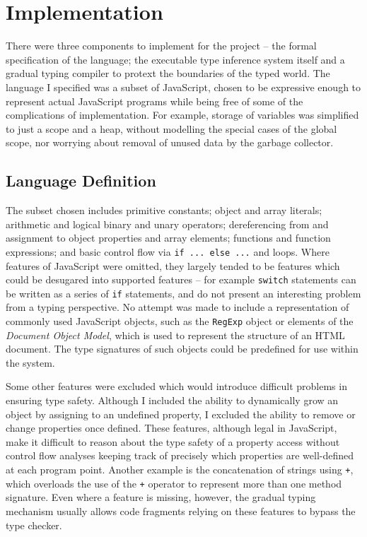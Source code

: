 \documentclass[12pt,a4paper,twoside,openright]{report}
\theoremstyle{definition}
\theoremstyle{dotless}
\newcommand*{\js}{\texttt}
\begin{document}
\chapter{Implementation}\label{implementation}

There were three components to implement for the project -- the formal
specification of the language; the executable type inference system itself and
a gradual typing compiler to protext the boundaries of the typed world.  The
language I specified was a subset of JavaScript, chosen to be expressive enough
to represent actual JavaScript programs while being free of some of the
complications of implementation. For example, storage of variables was
simplified to just a scope and a heap, without modelling the special cases of
the global scope, nor worrying about removal of unused data by the garbage
collector. 

\section{Language Definition}

The subset chosen includes primitive constants; object and array literals;
arithmetic and logical binary and unary operators; dereferencing from and
assignment to object properties and array elements; functions and function expressions; and basic control flow via \js{if ... else ...} and loops.  
Where features of JavaScript were omitted, they largely tended to be features
which could be desugared into supported features -- for example \js{switch}
statements can be written as a series of \js{if} statements, and do not present
an interesting problem from a typing perspective. No attempt was made to
include a representation of commonly used JavaScript objects, such as the
\js{RegExp} object or elements of the \textit{Document Object Model}, which is used to
represent the structure of an HTML document. The type signatures of such objects
could be predefined for use within the system.

Some other features were excluded which would introduce difficult problems in
ensuring type safety.  Although I included the ability to dynamically grow an
object by assigning to an undefined property, I excluded the ability to remove
or change properties once defined. These features, although legal in
JavaScript, make it difficult to reason about the type safety of a property
access without control flow analyses keeping track of precisely which
properties are well-defined at each program point. Another example is the
concatenation of strings using \js{+}, which overloads the use of the \js{+}
operator to represent more than one method signature. Even where a feature is
missing, however, the gradual typing mechanism usually allows code fragments
relying on these features to bypass the type checker.
\end{document}
